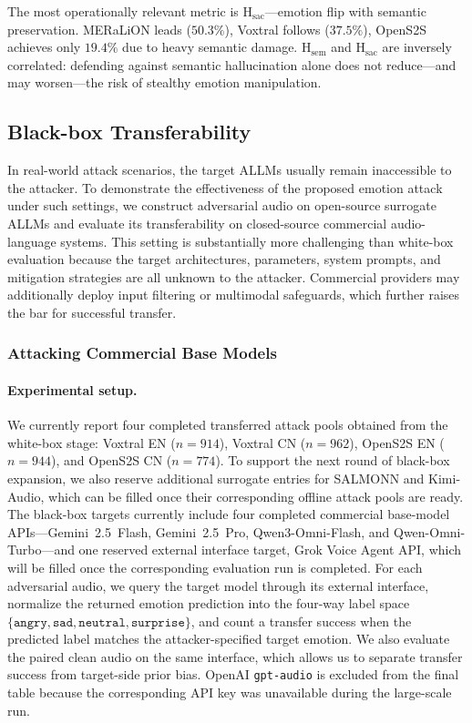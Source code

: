 The most operationally relevant metric is H$_{\text{sac}}$---emotion flip with semantic preservation.
MERaLiON leads ($50.3\%$), Voxtral follows ($37.5\%$), OpenS2S achieves only $19.4\%$ due to heavy semantic damage.
H$_{\text{sem}}$ and H$_{\text{sac}}$ are inversely correlated: defending against semantic hallucination alone does not reduce---and may worsen---the risk of stealthy emotion manipulation.



\subsection{Black-box Transferability}
\label{sec:exp_blackbox}

In real-world attack scenarios, the target ALLMs usually remain inaccessible to the attacker.
To demonstrate the effectiveness of the proposed emotion attack under such settings, we construct adversarial audio on open-source surrogate ALLMs and evaluate its transferability on closed-source commercial audio-language systems.
This setting is substantially more challenging than white-box evaluation because the target architectures, parameters, system prompts, and mitigation strategies are all unknown to the attacker.
Commercial providers may additionally deploy input filtering or multimodal safeguards, which further raises the bar for successful transfer.

\subsubsection{Attacking Commercial Base Models}

\paragraph{Experimental setup.}
We currently report four completed transferred attack pools obtained from the white-box stage: Voxtral EN ($n=914$), Voxtral CN ($n=962$), OpenS2S EN ($n=944$), and OpenS2S CN ($n=774$).
To support the next round of black-box expansion, we also reserve additional surrogate entries for SALMONN and Kimi-Audio, which can be filled once their corresponding offline attack pools are ready.
The black-box targets currently include four completed commercial base-model APIs---Gemini~2.5~Flash, Gemini~2.5~Pro, Qwen3-Omni-Flash, and Qwen-Omni-Turbo---and one reserved external interface target, Grok Voice Agent API, which will be filled once the corresponding evaluation run is completed.
For each adversarial audio, we query the target model through its external interface, normalize the returned emotion prediction into the four-way label space $\{\texttt{angry}, \texttt{sad}, \texttt{neutral}, \texttt{surprise}\}$, and count a transfer success when the predicted label matches the attacker-specified target emotion.
We also evaluate the paired clean audio on the same interface, which allows us to separate transfer success from target-side prior bias.
OpenAI \texttt{gpt-audio} is excluded from the final table because the corresponding API key was unavailable during the large-scale run.

